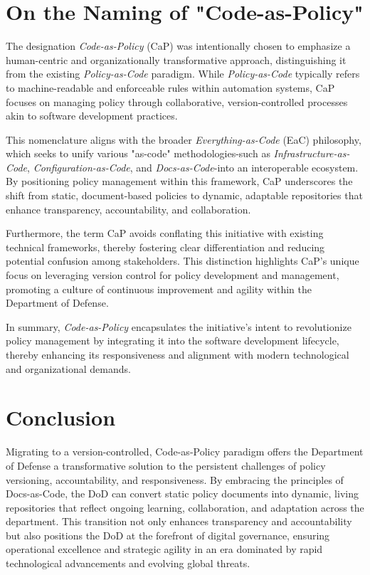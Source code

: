 \documentclass[11pt]{article}
\begin{document}
	\section{On the Naming of "Code-as-Policy"}

	The designation \textit{Code-as-Policy} (CaP) was intentionally chosen to emphasize a human-centric and organizationally transformative approach, distinguishing it from the existing \textit{Policy-as-Code} paradigm. While \textit{Policy-as-Code} typically refers to machine-readable and enforceable rules within automation systems, CaP focuses on managing policy through collaborative, version-controlled processes akin to software development practices.

	This nomenclature aligns with the broader \textit{Everything-as-Code} (EaC) philosophy, which seeks to unify various "as-code" methodologies-such as \textit{Infrastructure-as-Code}, \textit{Configuration-as-Code}, and \textit{Docs-as-Code}-into an interoperable ecosystem. By positioning policy management within this framework, CaP underscores the shift from static, document-based policies to dynamic, adaptable repositories that enhance transparency, accountability, and collaboration.

	Furthermore, the term CaP avoids conflating this initiative with existing technical frameworks, thereby fostering clear differentiation and reducing potential confusion among stakeholders. This distinction highlights CaP's unique focus on leveraging version control for policy development and management, promoting a culture of continuous improvement and agility within the Department of Defense.

	In summary, \textit{Code-as-Policy} encapsulates the initiative's intent to revolutionize policy management by integrating it into the software development lifecycle, thereby enhancing its responsiveness and alignment with modern technological and organizational demands.

	\section{Conclusion}

	Migrating to a version-controlled, Code-as-Policy paradigm offers the Department of Defense a transformative solution to the persistent challenges of policy versioning, accountability, and responsiveness. By embracing the principles of Docs-as-Code, the DoD can convert static policy documents into dynamic, living repositories that reflect ongoing learning, collaboration, and adaptation across the department. This transition not only enhances transparency and accountability but also positions the DoD at the forefront of digital governance, ensuring operational excellence and strategic agility in an era dominated by rapid technological advancements and evolving global threats.
\end{document}
